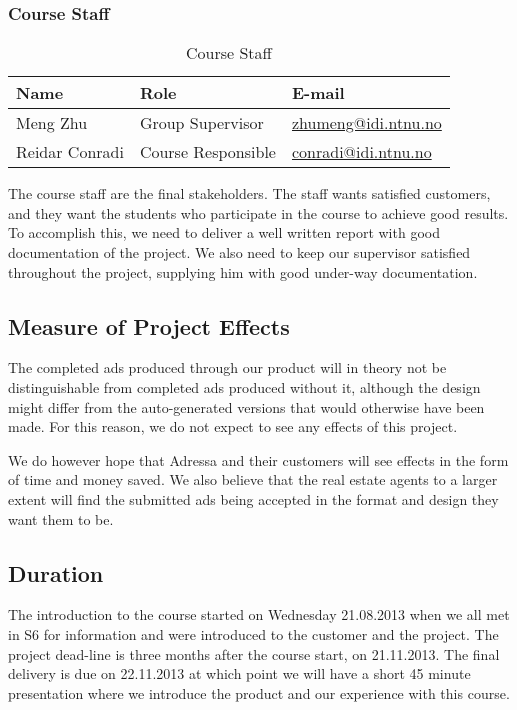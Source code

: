 \subsubsection{Course Staff}
\begin{table}[H]
\begin{tabular}{|p{4cm}|p{4cm}|p{5cm}|}
\hline
\textbf{Name} & \textbf{Role} & \textbf{E-mail} \\
\hline
Meng Zhu & Group Supervisor & \href{mailto://zhumeng@idi.ntnu.no}{zhumeng@idi.ntnu.no}\\
\hline
Reidar Conradi & Course Responsible & \href{mailto://conradi@idi.ntnu.no}{conradi@idi.ntnu.no}\\
\hline
\end{tabular}
\caption{Course Staff}
\end{table}

The course staff are the final stakeholders. The staff wants satisfied customers, and they want the students who participate in the course to achieve good results. To accomplish this, we need to deliver a well written report with good documentation of the project. We also need to keep our supervisor satisfied throughout the project, supplying him with good under-way documentation.

\subsection{Measure of Project Effects}
The completed ads produced through our product will in theory not be distinguishable from completed ads produced without it, although the design might differ from the auto-generated versions that would otherwise have been made. For this reason, we do not expect to see any effects of this project.

We do however hope that Adressa and their customers will see effects in the form of time and money saved. We also believe that the real estate agents to a larger extent will find the submitted ads being accepted in the format and design they want them to be.

\subsection{Duration}
The introduction to the course started on Wednesday 21.08.2013 when we all met in S6 for information and were introduced to the customer and the project.
The project dead-line is three months after the course start, on 21.11.2013.
The final delivery is due on 22.11.2013 at which point we will have a short 45 minute presentation where we introduce the product and our experience with this course.
